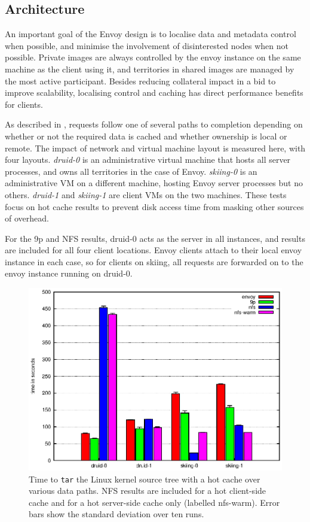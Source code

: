 \subsection{Architecture}\label{sec:architectural-costs}

An important goal of the Envoy design is to localise data and metadata control when possible, and minimise the involvement of disinterested nodes when not possible. Private images are always controlled by the envoy instance on the same machine as the client using it, and territories in shared images are managed by the most active participant. Besides reducing collateral impact in a bid to improve scalability, localising control and caching has direct performance benefits for clients.

As described in , requests follow one of several paths to completion depending on whether or not the required data is cached and whether ownership is local or remote. The impact of network and virtual machine layout is measured here, with four layouts. \emph{druid-0} is an administrative virtual machine that hosts all server processes, and owns all territories in the case of Envoy. \emph{skiing-0} is an administrative VM on a different machine, hosting Envoy server processes but no others. \emph{druid-1} and \emph{skiing-1} are client VMs on the two machines. These tests focus on hot cache results to prevent disk access time from masking other sources of overhead.

For the 9p and NFS results, druid-0 acts as the server in all instances, and results are included for all four client locations. Envoy clients attach to their local envoy instance in each case, so for clients on skiing, all requests are forwarded on to the envoy instance running on druid-0.

\begin{figure}[t]
\centering
\includegraphics[width=\figwidth]{figures/arch-tar-hot}
\caption[\texttt{tar} benchmark results with a hot cache]{Time to \texttt{tar} the Linux kernel source tree with a hot cache over various data paths. NFS results are included for a hot client-side cache and for a hot server-side cache only (labelled nfs-warm). Error bars show the standard deviation over ten runs.}
\label{fig:arch-tar-hot}
\end{figure}

